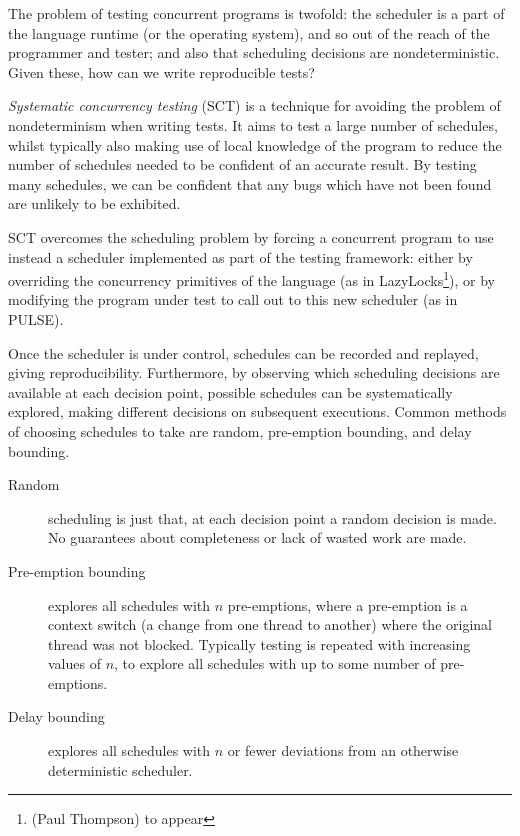 The problem of testing concurrent programs is twofold: the scheduler
is a part of the language runtime (or the operating system), and so
out of the reach of the programmer and tester; and also that
scheduling decisions are nondeterministic. Given these, how can we
write reproducible tests?

\textit{Systematic concurrency testing} (SCT)\cite{pbound, dbound,
  empirical, heisenbugs} is a technique for avoiding the problem of
nondeterminism when writing tests. It aims to test a large number of
schedules, whilst typically also making use of local knowledge of the
program to reduce the number of schedules needed to be confident of an
accurate result. By testing many schedules, we can be confident that
any bugs which have not been found are unlikely to be exhibited.

SCT overcomes the scheduling problem by forcing a concurrent program
to use instead a scheduler implemented as part of the testing
framework: either by overriding the concurrency primitives of the
language (as in LazyLocks\footnote{(Paul Thompson) to appear}), or by
modifying the program under test to call out to this new scheduler (as
in PULSE\cite{pulse}).

Once the scheduler is under control, schedules can be recorded and
replayed, giving reproducibility. Furthermore, by observing which
scheduling decisions are available at each decision point, possible
schedules can be systematically explored, making different decisions
on subsequent executions. Common methods of choosing schedules to take
are random\cite{empirical}, pre-emption bounding\cite{pbound}, and
delay bounding\cite{dbound}.

\begin{description}
  \item[Random] scheduling is just that, at each decision point a
    random decision is made. No guarantees about completeness or lack
    of wasted work are made.

  \item[Pre-emption bounding] explores all schedules with $n$
    pre-emptions, where a pre-emption is a context switch (a change
    from one thread to another) where the original thread was not
    blocked. Typically testing is repeated with increasing values of
    $n$, to explore all schedules with up to some number of
    pre-emptions.

  \item[Delay bounding] explores all schedules with $n$ or fewer
    deviations from an otherwise deterministic scheduler.
\end{description}

